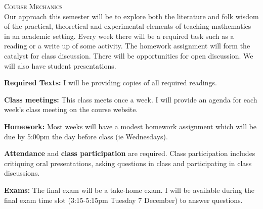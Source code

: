 \documentclass[12pt]{article}
\newcommand{\sups}[1]{\textsuperscript{#1}}
\begin{document}
\textsc{Course Mechanics}\\
Our approach this semester will be to explore both the literature and folk wisdom of the practical, theoretical and experimental elements of teaching mathematics in an academic setting. Every week there will be a required task such as a reading or a write up of some activity. The homework assignment will form the catalyst for class discussion. There will be opportunities for open discussion. We will also have student presentations.

 
\textbf{Required Texts:} 
I will be providing copies of all required readings.

\textbf{Class meetings:} This class meets once a week. I will provide an agenda for each week's class meeting on the course website.

\textbf{Homework:} Most weeks will have a modest homework assignment which will be due by 5:00pm the day before class (ie Wednesdays).


\textbf{Attendance} and {\bf class participation} are required. Class participation includes critiquing oral presentations, asking questions in class and participating in class discussions. 


\textbf{Exams:} %
The final exam will be a take-home exam. I will be available during the final exam time slot (3:15-5:15pm Tuesday 7 December) to answer questions.
\end{document}
